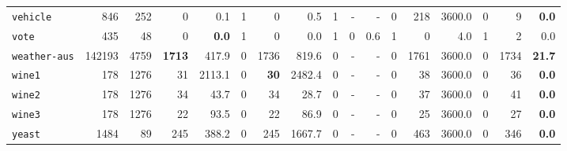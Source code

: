 \begin{tabular}{lccrrrrrrrrrrrrrr}
\texttt{vehicle} & \multicolumn{1}{r}{846} & \multicolumn{1}{r}{252}  & 0 & 0.1 & 1 & 0 & 0.5 & 1 & - & - & 0 & 218 & 3600.0 & 0 & 9 & \textbf{0.0}\\
\texttt{vote} & \multicolumn{1}{r}{435} & \multicolumn{1}{r}{48}  & 0 & \textbf{0.0} & 1 & 0 & 0.0 & 1 & 0 & 0.6 & 1 & 0 & 4.0 & 1 & 2 & 0.0\\
\texttt{weather-aus} & \multicolumn{1}{r}{142193} & \multicolumn{1}{r}{4759}  & \textbf{1713} & 417.9 & 0 & 1736 & 819.6 & 0 & - & - & 0 & 1761 & 3600.0 & 0 & 1734 & \textbf{21.7}\\
\texttt{wine1} & \multicolumn{1}{r}{178} & \multicolumn{1}{r}{1276}  & 31 & 2113.1 & 0 & \textbf{30} & 2482.4 & 0 & - & - & 0 & 38 & 3600.0 & 0 & 36 & \textbf{0.0}\\
\texttt{wine2} & \multicolumn{1}{r}{178} & \multicolumn{1}{r}{1276}  & 34 & 43.7 & 0 & 34 & 28.7 & 0 & - & - & 0 & 37 & 3600.0 & 0 & 41 & \textbf{0.0}\\
\texttt{wine3} & \multicolumn{1}{r}{178} & \multicolumn{1}{r}{1276}  & 22 & 93.5 & 0 & 22 & 86.9 & 0 & - & - & 0 & 25 & 3600.0 & 0 & 27 & \textbf{0.0}\\
\texttt{yeast} & \multicolumn{1}{r}{1484} & \multicolumn{1}{r}{89}  & 245 & 388.2 & 0 & 245 & 1667.7 & 0 & - & - & 0 & 463 & 3600.0 & 0 & 346 & \textbf{0.0}\\
\bottomrule
\end{tabular}
